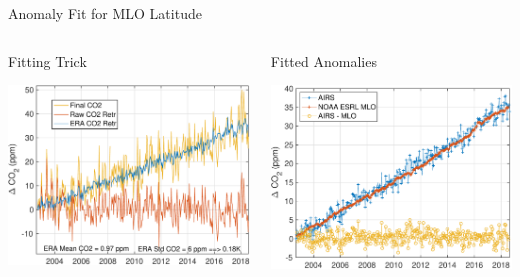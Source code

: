 \documentclass[10pt,t]{beamer}
\begin{document}
\begin{frame}[label={sec:orga1eeb73}]{\cd Anomaly Fit for MLO Latitude}
\vspace{-0.3in}
\begin{columns}
\begin{column}{0.55\columnwidth}
\begin{block}{\footnotesize Fitting Trick}
\begin{center}
\includegraphics[width=\linewidth]{./Figs/Pdf/raw_co2_vs_era_co2_example_lati28_mlo_lat.pdf}
\end{center}
\end{block}
\end{column}

\begin{column}{0.55\columnwidth}
\begin{block}{\footnotesize Fitted \cd Anomalies}
\begin{center}
\includegraphics[width=\linewidth]{./Figs/Pdf/co2_airs_vs_mlo.pdf}
\end{center}
\end{block}
\end{column}
\end{columns}


\end{frame}
\end{document}
